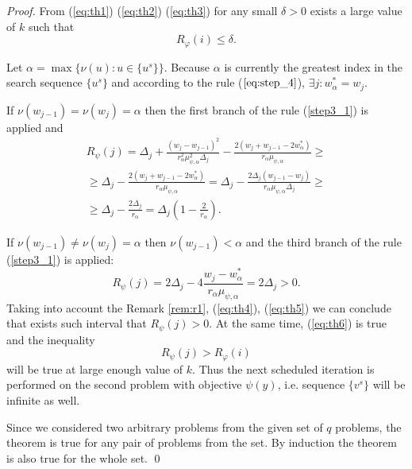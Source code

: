 \documentclass[runningheads]{llncs}
\begin{document}
\begin{proof}
  From (\ref{eq:th1}) (\ref{eq:th2}) (\ref{eq:th3}) for any small \(\delta > 0\) exists a large value of \(k\) such that
  \begin{equation}
    R_\varphi(i)\leqslant \delta.
    \label{eq:th6}
  \end{equation}

  Let \(\alpha = \max\{\nu(u):u\in\{u^s\}\}\). Because \(\alpha\) is currently the greatest index
  in the search sequence \(\{u^s\}\) and according to the rule (\(\ref{eq:step_4}\)), \(\exists j: w^*_\alpha=w_j\).

  If \(\nu(w_{j-1})=\nu(w_{j})=\alpha\) then the first branch of the rule (\ref{step3_1}) is applied and
  \begin{equation}
    \begin{array}{l}
      R_\psi(j)=\Delta_j + \frac{(w_j-w_{j-1})^2}{r_\alpha^2\mu_{\psi,\alpha}^2\Delta_j}
        - \frac{2(w_j+w_{j-1}-2w^*_\alpha)}{r_\alpha\mu_{\psi,\alpha}} \geqslant \\
        \geqslant\Delta_j - \frac{2(w_j+w_{j-1}-2w^*_\alpha)}{r_\alpha\mu_{\psi,\alpha}} =
        \Delta_j - \frac{2\Delta_j(w_{j-1}-w_j)}{r_\alpha\mu_{\psi,\alpha}\Delta_j} \geqslant\\
        \geqslant \Delta_j - \frac{2\Delta_j}{r_\alpha} = \Delta_j\left(1-\frac{2}{r_\alpha}\right).
      \end{array}
    \label{eq:th4}
  \end{equation}

  If \(\nu(w_{j-1})\ne\nu(w_{j})=\alpha\) then \(\nu(w_{j-1})<\alpha\) and the third branch of
  the rule (\ref{step3_1}) is applied:
  \begin{equation}
    R_\psi(j)=2\Delta_j - 4 \frac{w_j-w^*_{\alpha}}{r_\alpha \mu_{\psi,\alpha}}=2\Delta_j > 0.
    \label{eq:th5}
  \end{equation}
  Taking into account the Remark \ref{rem:r1}, (\ref{eq:th4}), (\ref{eq:th5}) we can conclude that
  exists such interval that \(R_\psi(j)>0\). At the same time, (\ref{eq:th6}) is true and
  the inequality
  \begin{displaymath}
    R_\psi(j) > R_\varphi(i)
  \end{displaymath}
  will be true at large enough value of \(k\). Thus the next scheduled iteration is performed on
  the second problem with objective \(\psi(y)\), i.e. sequence \(\{v^s\}\) will be infinite as well.

  Since we considered two arbitrary problems from the given set of \(q\) problems, the theorem is
  true for any pair of problems from the set. By induction the theorem is also true for the whole
  set.
\qed
\end{proof}
\end{document}
